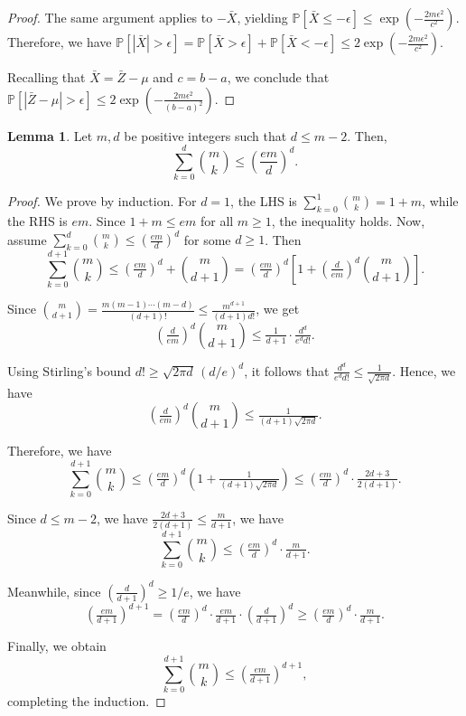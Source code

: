 \documentclass[openany, amssymb, psamsfonts]{amsart}
\theoremstyle{definition}
\numberwithin{equation}{section}
\newtheorem{appendixlemma}{Lemma}
\begin{document}
\begin{proof}
The same argument applies to $-\bar{X}$, yielding $\mathbb{P}\left[\bar{X} \leq -\epsilon\right] \leq \exp \!\left( -\tfrac{2 m \epsilon^2}{c^2} \right)$.  
Therefore, we have $\mathbb{P}\left[|\bar{X}| > \epsilon\right] = \mathbb{P}\left[\bar{X} > \epsilon\right] + \mathbb{P}\left[\bar{X} < -\epsilon\right] \leq 2 \exp \!\left( -\tfrac{2 m \epsilon^2}{c^2} \right)$.  

Recalling that $\bar{X} = \bar{Z} - \mu$ and $c = b - a$, we conclude that $\mathbb{P}\left[ \left| \bar{Z} - \mu \right| > \epsilon \right] \leq 2 \exp \!\left( -\tfrac{2 m \epsilon^2}{(b - a)^2} \right)$.
\end{proof}

\begin{appendixlemma}\label{appendix lemma: 8}
Let \( m, d \) be positive integers such that \( d \leq m - 2 \). Then,
\[
\sum_{k=0}^{d} \binom{m}{k} \leq \left( \frac{e m}{d} \right)^d.
\]
\end{appendixlemma}
\begin{proof}
We prove by induction. For $d=1$, the LHS is $\sum_{k=0}^1 \binom{m}{k}=1+m$, while the RHS is $em$. Since $1+m\le em$ for all $m\ge1$, the inequality holds. Now, assume $\sum_{k=0}^d \binom{m}{k}\le \left(\tfrac{em}{d}\right)^d$ for some $d\ge1$. Then
\[
\sum_{k=0}^{d+1}\binom{m}{k}\le \left(\tfrac{em}{d}\right)^d+\binom{m}{d+1}
= \left(\tfrac{em}{d}\right)^d\!\left[1+\left(\tfrac{d}{em}\right)^d\binom{m}{d+1}\right].
\]

Since $\binom{m}{d+1}=\tfrac{m(m-1)\cdots(m-d)}{(d+1)!}\le \tfrac{m^{d+1}}{(d+1)d!}$, we get
\[
\left(\tfrac{d}{em}\right)^d\binom{m}{d+1}\le \tfrac{1}{d+1}\cdot\tfrac{d^d}{e^d d!}.
\]

Using Stirling’s bound $d!\ge\sqrt{2\pi d}\,(d/e)^d$, it follows that $\tfrac{d^d}{e^d d!}\le \tfrac{1}{\sqrt{2\pi d}}$. Hence, we have
\[
\left(\tfrac{d}{em}\right)^d\binom{m}{d+1}\le \tfrac{1}{(d+1)\sqrt{2\pi d}}.
\]

Therefore, we have
\[
\sum_{k=0}^{d+1}\binom{m}{k}\le \left(\tfrac{em}{d}\right)^d\!\left(1+\tfrac{1}{(d+1)\sqrt{2\pi d}}\right)\le \left(\tfrac{em}{d}\right)^d\cdot\tfrac{2d+3}{2(d+1)}.
\]

Since $d\le m-2$, we have $\tfrac{2d+3}{2(d+1)}\le \tfrac{m}{d+1}$, we have
\[
\sum_{k=0}^{d+1}\binom{m}{k}\le \left(\tfrac{em}{d}\right)^d\cdot\tfrac{m}{d+1}.
\]

Meanwhile, since $\left(\tfrac{d}{d+1}\right)^d\ge1/e$, we have
\[
\left(\tfrac{em}{d+1}\right)^{d+1}=\left(\tfrac{em}{d}\right)^d\cdot\tfrac{em}{d+1}\cdot\left(\tfrac{d}{d+1}\right)^d
\ge \left(\tfrac{em}{d}\right)^d\cdot\tfrac{m}{d+1}.
\]

Finally, we obtain
\[
\sum_{k=0}^{d+1}\binom{m}{k}\le \left(\tfrac{em}{d+1}\right)^{d+1},
\]
completing the induction.
\end{proof}
\end{document}
